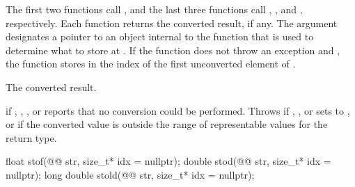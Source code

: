 \documentclass[ebook,11pt,article]{memoir}
\begin{document}
\begin{itemdescr}
\pnum
\effects {} The first two functions call ,
and the last three functions call ,
, and , respectively. Each function returns the converted result, if any. The
argument  designates a pointer to an object internal to the function
that is used to determine what to store at . If the function does
not throw an exception and , the function stores in 
the index of the first unconverted element of .

\pnum
\returns The converted result.

\pnum
\throws {} if , ,
, or  reports that no conversion could be
performed. Throws  if , ,
 or  sets  to ,
or if the converted value is outside the range of representable values
for the return type.
\end{itemdescr}

%
%
%
\begin{itemdecl}
float stof(@@ str, size_t* idx = nullptr);
double stod(@@ str, size_t* idx = nullptr);
long double stold(@@ str, size_t* idx = nullptr);
\end{itemdecl}
\end{document}

